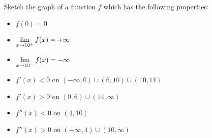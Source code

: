 \documentclass[10pt,t,handout,ignorenonframetext,aspectratio=169]{beamer}
\begin{document}
\begin{frame}
  \vs{}
  \begin{example}
    Sketch the graph of a function $f$ which has the following properties:
  \end{example}
  \begingroup
  \footnotesize
  \begin{minipage}[t]{0.4\linewidth}
    \begin{itemize}
    \item $f(0)=0$
    \item $\displaystyle \lim_{x \to 10^+} f(x) = +\infty$
    \item $\displaystyle \lim_{x \to 10^-} f(x) = -\infty$
    \end{itemize}
  \end{minipage}
  \hfill
  \begin{minipage}[t]{0.58\linewidth}
    \begin{itemize}
    \item $f'(x)<0$ on $(-\infty,0) \cup (6,10) \cup (10,14)$
    \item $f'(x)>0$ on $(0,6) \cup (14,\infty)$
    \item $f''(x)<0$ on $(4,10)$
    \item $f''(x)>0$ on $(-\infty,4) \cup (10,\infty)$
    \end{itemize}
  \end{minipage}
  \endgroup
\end{frame}
\end{document}
